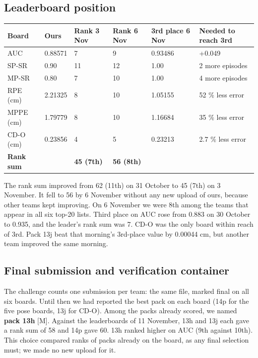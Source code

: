 \documentclass[11pt]{article}
\begin{document}
\subsection{Leaderboard position}
\begin{table}[tbp]
\centering\small
\begin{tabularx}{\linewidth}{llllll}
\toprule
\textbf{Board} & \textbf{Ours} & \textbf{Rank 3 Nov} & \textbf{Rank 6 Nov} & \textbf{3rd place 6 Nov} & \textbf{Needed to reach 3rd} \\
\midrule
AUC & 0.88571 & 7 & 9 & 0.93486 & +0.049 \\
SP-SR & 0.90 & 11 & 12 & 1.00 & 2 more episodes \\
MP-SR & 0.80 & 7 & 10 & 1.00 & 4 more episodes \\
RPE (cm) & 2.21325 & 8 & 10 & 1.05155 & 52 \% less error \\
MPPE (cm) & 1.79779 & 8 & 10 & 1.16684 & 35 \% less error \\
CD-O (cm) & 0.23856 & 4 & 5 & 0.23213 & 2.7 \% less error \\
\textbf{Rank sum} &  & \textbf{45 (7th)} & \textbf{56 (8th)} &  &  \\
\bottomrule
\end{tabularx}
\end{table}
The rank sum improved from 62 (11th) on 31 October to 45 (7th) on 3 November. It fell to 56 by 6 November without any new upload of ours, because other teams kept improving. On 6 November we were 8th among the teams that appear in all six top-20 lists. Third place on AUC rose from 0.883 on 30 October to 0.935, and the leader's rank sum was 7. CD-O was the only board within reach of 3rd. Pack 13j beat that morning's 3rd-place value by 0.00044 cm, but another team improved the same morning.

\subsection{Final submission and verification container}
The challenge counts one submission per team: the same file, marked final on all six boards. Until then we had reported the best pack on each board (14p for the five pose boards, 13j for CD-O). Among the packs already scored, we named \textbf{pack 13h} {[}M{]}. Against the leaderboards of 11 November, 13h and 13j each gave a rank sum of 58 and 14p gave 60. 13h ranked higher on AUC (9th against 10th). This choice compared ranks of packs already on the board, as any final selection must; we made no new upload for it.
\end{document}
